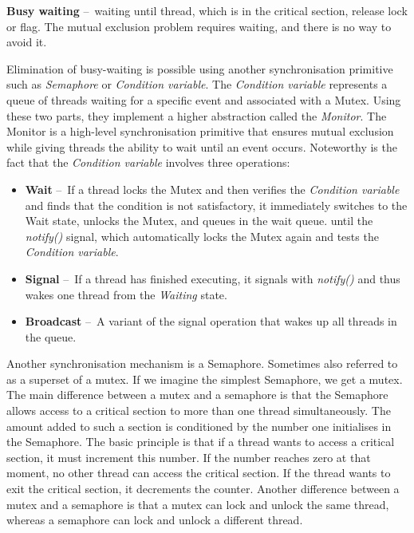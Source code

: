 \begin{definition}
    \textbf{Busy waiting} \---\ waiting until thread, which is in the critical section, release lock or flag.
    The mutual exclusion problem requires waiting, and there is no way to avoid it.
\end{definition}
Elimination of busy-waiting is possible using another synchronisation primitive such as \emph{Semaphore} or \emph{Condition variable}.
The \emph{Condition variable} represents a queue of threads waiting for a specific event and associated with a Mutex.
Using these two parts, they implement a higher abstraction called the \emph{Monitor}.
The Monitor is a high-level synchronisation primitive that ensures mutual exclusion while giving threads the ability to wait until an event occurs.
Noteworthy is the fact that the \emph{Condition variable} involves three operations:
\begin{itemize}[itemsep=1mm, parsep=0pt]
    \item \textbf {Wait} \---\ If a thread locks the Mutex and then verifies the \emph{Condition variable} and finds that the condition is not satisfactory, it immediately switches to the Wait state, unlocks the Mutex, and queues in the wait queue.
    until the \emph{notify()} signal, which automatically locks the Mutex again and tests the \emph{Condition variable}.
    \item \textbf{Signal} \---\ If a thread has finished executing, it signals with \emph{notify()} and thus wakes one thread from the \emph{Waiting} state.
    \item \textbf{Broadcast} \---\ A variant of the signal operation that wakes up all threads in the queue.
\end{itemize}
Another synchronisation mechanism is a Semaphore.
Sometimes also referred to as a superset of a mutex.
If we imagine the simplest Semaphore, we get a mutex.
The main difference between a mutex and a semaphore is that the Semaphore allows access to a critical section to more than one thread simultaneously.
The amount added to such a section is conditioned by the number one initialises in the Semaphore.
The basic principle is that if a thread wants to access a critical section, it must increment this number.
If the number reaches zero at that moment, no other thread can access the critical section.
If the thread wants to exit the critical section, it decrements the counter.
Another difference between a mutex and a semaphore is that a mutex can lock and unlock the same thread, whereas a semaphore can lock and unlock a different thread.


